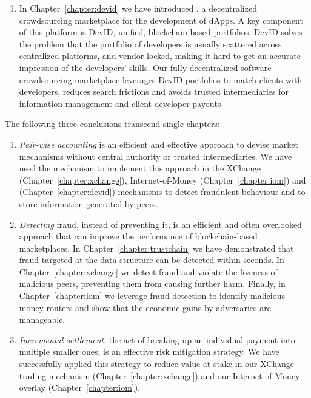 \begin{enumerate}
	\item In Chapter~\ref{chapter:devid} we have introduced \Dappcoder{}, a decentralized crowdsourcing marketplace for the development of dApps.
	A key component of this platform is DevID, unified, blockchain-based portfolios.
	DevID solves the problem that the portfolio of developers is usually scattered across centralized platforms, and vendor locked, making it hard to get an accurate impression of the developers' skills.
	Our fully decentralized software crowdsourcing marketplace leverages DevID portfolios to match clients with developers, reduces search frictions and avoids trusted intermediaries for information management and client-developer payouts.
\end{enumerate}

\noindent The following three conclusions transcend single chapters:

\begin{enumerate}[resume]	
	\item \emph{Pair-wise accounting} is an efficient and effective approach to devise market mechanisms without central authority or trusted intermediaries.
	We have used the \TrustChain{} mechanism to implement this approach in the XChange (Chapter~\ref{chapter:xchange}), Internet-of-Money (Chapter~\ref{chapter:iom}) and \Dappcoder{} (Chapter~\ref{chapter:devid}) mechanisms to detect fraudulent behaviour and to store information generated by peers.
	
	\item \emph{Detecting} fraud, instead of preventing it, is an efficient and often overlooked approach that can improve the performance of blockchain-based marketplaces.
	In Chapter~\ref{chapter:trustchain} we have demonstrated that fraud targeted at the \TrustChain{} data structure can be detected within seconds.
	In Chapter~\ref{chapter:xchange} we detect fraud and violate the liveness of malicious peers, preventing them from causing further harm.
	Finally, in Chapter~\ref{chapter:iom} we leverage fraud detection to identify malicious money routers and show that the economic gains by adversaries are manageable.
	
	\item \emph{Incremental settlement}, the act of breaking up an individual payment into multiple smaller ones, is an effective risk mitigation strategy.
	We have successfully applied this strategy to reduce value-at-stake in our XChange trading mechanism (Chapter~\ref{chapter:xchange}) and our Internet-of-Money overlay (Chapter~\ref{chapter:iom}).
	
\end{enumerate}


